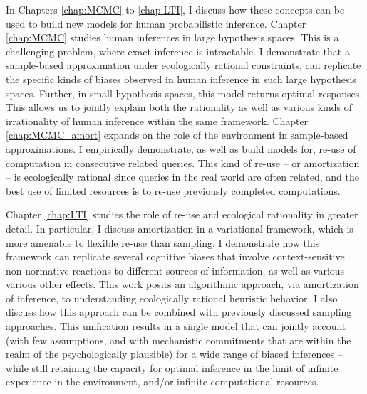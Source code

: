 In Chapters \ref{chap:MCMC} to \ref{chap:LTI}, I discuss how these concepts can be used to build new models for human probabilistic inference. Chapter \ref{chap:MCMC} studies human inferences in large hypothesis spaces. This is a challenging problem, where exact inference is intractable. I demonstrate that a sample-based approximation under ecologically rational constraints, can replicate the specific kinds of biases observed in human inference in such large hypothesis spaces. 
Further, in small hypothesis spaces, this model returns optimal responses. This allows us to jointly explain both the rationality as well as various kinds of irrationality of human inference within the same framework. Chapter \ref{chap:MCMC_amort} expands on the role of the environment in sample-based approximations. I empirically demonstrate, as well as build models for, re-use of computation in consecutive related queries. This kind of re-use -- or amortization -- is ecologically rational since queries in the real world are often related, and the best use of limited resources is to re-use previously completed computations.

Chapter \ref{chap:LTI} studies the role of re-use and ecological rationality in greater detail. In particular, I discuss amortization in a variational framework, which is more amenable to flexible re-use than sampling. I demonstrate how this framework can replicate several cognitive biases that involve context-sensitive non-normative reactions to different sources of information, 
as well as various various other effects.
This work posits an algorithmic approach, via amortization of inference, to understanding ecologically rational heuristic behavior. I also discuss how this approach can be combined with previously discussed sampling approaches. This unification results in a single model that can jointly account (with few assumptions, and with mechanistic commitments that are within the realm of the psychologically plausible) for a wide range of biased inferences -- while still retaining the capacity for optimal inference in the limit of infinite experience in the environment, and/or infinite computational resources.

